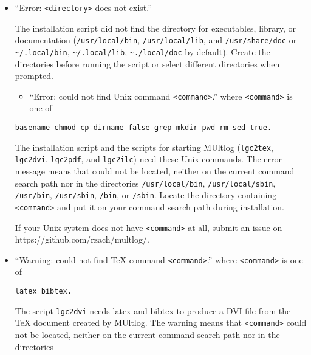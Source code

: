 \documentclass[]{article}
\providecommand{\tightlist}{%
  \setlength{\itemsep}{0pt}\setlength{\parskip}{0pt}}
\begin{document}
\begin{itemize}
\item
  ``Error: \texttt{\textless{}directory\textgreater{}} does not exist.''

  The installation script did not find the directory for executables,
  library, or documentation (\texttt{/usr/local/bin},
  \texttt{/usr/local/lib}, and \texttt{/usr/share/doc} or
  \texttt{\textasciitilde{}/.local/bin},
  \texttt{\textasciitilde{}/.local/lib},
  \texttt{\textasciitilde{}./local/doc} by default). Create the
  directories before running the script or select different directories
  when prompted.

  \begin{itemize}
  \tightlist
  \item
    ``Error: could not find Unix command
    \texttt{\textless{}command\textgreater{}}.'' where
    \texttt{\textless{}command\textgreater{}} is one of
  \end{itemize}

\begin{verbatim}
basename chmod cp dirname false grep mkdir pwd rm sed true.
\end{verbatim}

  The installation script and the scripts for starting MUltlog
  (\texttt{lgc2tex}, \texttt{lgc2dvi}, \texttt{lgc2pdf}, and
  \texttt{lgc2ilc}) need these Unix commands. The error message means
  that could not be located, neither on the current command search path
  nor in the directories \texttt{/usr/local/bin},
  \texttt{/usr/local/sbin}, \texttt{/usr/bin}, \texttt{/usr/sbin},
  \texttt{/bin}, or \texttt{/sbin}. Locate the directory containing
  \texttt{\textless{}command\textgreater{}} and put it on your command
  search path during installation.

  If your Unix system does not have
  \texttt{\textless{}command\textgreater{}} at all, submit an issue on
  https://github.com/rzach/multlog/.
\item
  ``Warning: could not find TeX command
  \texttt{\textless{}command\textgreater{}}.'' where
  \texttt{\textless{}command\textgreater{}} is one of

\begin{verbatim}
latex bibtex.
\end{verbatim}

  The script \texttt{lgc2dvi} needs latex and bibtex to produce a
  DVI-file from the TeX document created by MUltlog. The warning means
  that \texttt{\textless{}command\textgreater{}} could not be located,
  neither on the current command search path nor in the directories


\end{itemize}
\end{document}
